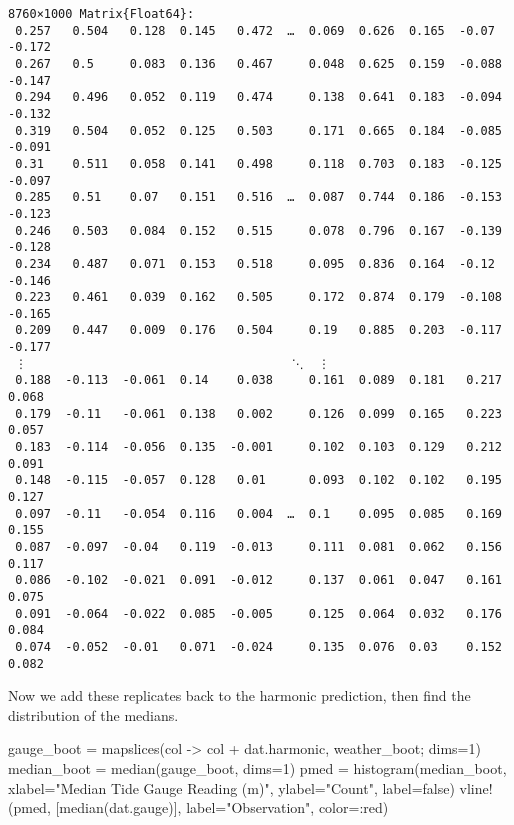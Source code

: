\documentclass[
  letterpaper,
  DIV=11,
  numbers=noendperiod]{scrartcl}
\newenvironment{Shaded}{\begin{snugshade}}{\end{snugshade}}
\newcommand{\CharTok}[1]{\textcolor[rgb]{0.13,0.47,0.30}{#1}}
\newcommand{\ConstantTok}[1]{\textcolor[rgb]{0.56,0.35,0.01}{#1}}
\newcommand{\FloatTok}[1]{\textcolor[rgb]{0.68,0.00,0.00}{#1}}
\newcommand{\FunctionTok}[1]{\textcolor[rgb]{0.28,0.35,0.67}{#1}}
\newcommand{\NormalTok}[1]{\textcolor[rgb]{0.00,0.23,0.31}{#1}}
\newcommand{\OperatorTok}[1]{\textcolor[rgb]{0.37,0.37,0.37}{#1}}
\newcommand{\StringTok}[1]{\textcolor[rgb]{0.13,0.47,0.30}{#1}}
\begin{document}
\begin{verbatim}
8760×1000 Matrix{Float64}:
 0.257   0.504   0.128  0.145   0.472  …  0.069  0.626  0.165  -0.07   -0.172
 0.267   0.5     0.083  0.136   0.467     0.048  0.625  0.159  -0.088  -0.147
 0.294   0.496   0.052  0.119   0.474     0.138  0.641  0.183  -0.094  -0.132
 0.319   0.504   0.052  0.125   0.503     0.171  0.665  0.184  -0.085  -0.091
 0.31    0.511   0.058  0.141   0.498     0.118  0.703  0.183  -0.125  -0.097
 0.285   0.51    0.07   0.151   0.516  …  0.087  0.744  0.186  -0.153  -0.123
 0.246   0.503   0.084  0.152   0.515     0.078  0.796  0.167  -0.139  -0.128
 0.234   0.487   0.071  0.153   0.518     0.095  0.836  0.164  -0.12   -0.146
 0.223   0.461   0.039  0.162   0.505     0.172  0.874  0.179  -0.108  -0.165
 0.209   0.447   0.009  0.176   0.504     0.19   0.885  0.203  -0.117  -0.177
 ⋮                                     ⋱  ⋮                            
 0.188  -0.113  -0.061  0.14    0.038     0.161  0.089  0.181   0.217   0.068
 0.179  -0.11   -0.061  0.138   0.002     0.126  0.099  0.165   0.223   0.057
 0.183  -0.114  -0.056  0.135  -0.001     0.102  0.103  0.129   0.212   0.091
 0.148  -0.115  -0.057  0.128   0.01      0.093  0.102  0.102   0.195   0.127
 0.097  -0.11   -0.054  0.116   0.004  …  0.1    0.095  0.085   0.169   0.155
 0.087  -0.097  -0.04   0.119  -0.013     0.111  0.081  0.062   0.156   0.117
 0.086  -0.102  -0.021  0.091  -0.012     0.137  0.061  0.047   0.161   0.075
 0.091  -0.064  -0.022  0.085  -0.005     0.125  0.064  0.032   0.176   0.084
 0.074  -0.052  -0.01   0.071  -0.024     0.135  0.076  0.03    0.152   0.082
\end{verbatim}

Now we add these replicates back to the harmonic prediction, then find
the distribution of the medians.

\begin{Shaded}
\begin{Highlighting}[]
\NormalTok{gauge\_boot }\OperatorTok{=} \FunctionTok{mapslices}\NormalTok{(col }\OperatorTok{{-}\textgreater{}}\NormalTok{ col }\OperatorTok{+}\NormalTok{ dat.harmonic, weather\_boot; dims}\OperatorTok{=}\FloatTok{1}\NormalTok{)}
\NormalTok{median\_boot }\OperatorTok{=} \FunctionTok{median}\NormalTok{(gauge\_boot, dims}\OperatorTok{=}\FloatTok{1}\NormalTok{)}\CharTok{\textquotesingle{}}
\NormalTok{pmed }\OperatorTok{=} \FunctionTok{histogram}\NormalTok{(median\_boot, xlabel}\OperatorTok{=}\StringTok{"Median Tide Gauge Reading (m)"}\NormalTok{, ylabel}\OperatorTok{=}\StringTok{"Count"}\NormalTok{, label}\OperatorTok{=}\ConstantTok{false}\NormalTok{)}
\FunctionTok{vline!}\NormalTok{(pmed, [}\FunctionTok{median}\NormalTok{(dat.gauge)], label}\OperatorTok{=}\StringTok{"Observation"}\NormalTok{, color}\OperatorTok{=:}\NormalTok{red)}
\end{Highlighting}
\end{Shaded}
\end{document}

